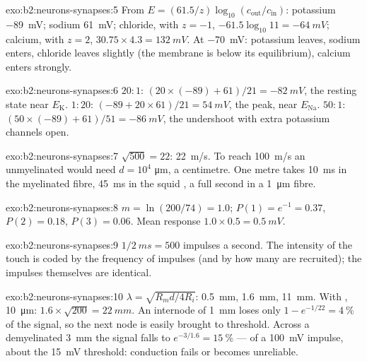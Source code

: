 \begin{solution}{exo:b2:neurons-synapses:5}
From $E = (61.5/z)\log_{10}(c_{\text{out}}/c_{\text{in}})$:
potassium \qty{-89}{mV}; sodium \qty{+61}{mV}; chloride, with $z =
-1$, $-61.5\log_{10} 11 = \qty{-64}{mV}$; calcium, with $z = 2$,
$30.75\times 4.3 = \qty{+132}{mV}$. At \qty{-70}{mV}:
potassium leaves, sodium enters, chloride leaves slightly (the
membrane is below its equilibrium), calcium enters strongly.
\end{solution}

\begin{solution}{exo:b2:neurons-synapses:6}
$20 : 1$: $(20\times(-89) + 61)/21 = \qty{-82}{mV}$, the resting
state near $E_{\mathrm K}$. $1 : 20$: $(-89 + 20\times 61)/21 =
\qty{+54}{mV}$, the peak, near $E_{\mathrm{Na}}$. $50 : 1$: $(50\times
(-89) + 61)/51 = \qty{-86}{mV}$, the undershoot with extra potassium
channels open.
\end{solution}

\begin{solution}{exo:b2:neurons-synapses:7}
$\sqrt{500} = 22$: \qty{22}{m/s}. To reach \qty{100}{m/s} an
unmyelinated  would need $d = 10^{4}$ \unit{\micro m}, a
centimetre. One metre takes \qty{10}{ms} in the myelinated fibre,
\qty{45}{ms} in the squid , a full second in a \qty{1}{\micro m}
fibre.
\end{solution}

\begin{solution}{exo:b2:neurons-synapses:8}
$m = \ln(200/74) = 1.0$; $P(1) = e^{-1} = 0.37$, $P(2) = 0.18$, $P(3)
= 0.06$. Mean response $1.0\times 0.5 = \qty{0.5}{mV}$.
\end{solution}

\begin{solution}{exo:b2:neurons-synapses:9}
$1/\qty{2}{ms} = 500$ impulses a second. The intensity of the touch
is coded by the frequency of impulses (and by how many  are
recruited); the impulses themselves are identical.
\end{solution}

\begin{solution}{exo:b2:neurons-synapses:10}
$\lambda = \sqrt{R_m d/4R_i}$: \qty{0.5}{mm}, \qty{1.6}{mm},
\qty{11}{mm}. With , \qty{10}{\micro m}: $1.6\times\sqrt{200} =
\qty{22}{mm}$. An internode of \qty{1}{mm} loses only $1 - e^{-1/22}
= \qty{4}{\%}$ of the signal, so the next node is easily brought to
threshold. Across a demyelinated \qty{3}{mm} the signal falls to
$e^{-3/1.6} = \qty{15}{\%}$ --- of a \qty{100}{mV} impulse, about the
\qty{15}{mV} threshold: conduction fails or becomes unreliable.
\end{solution}

